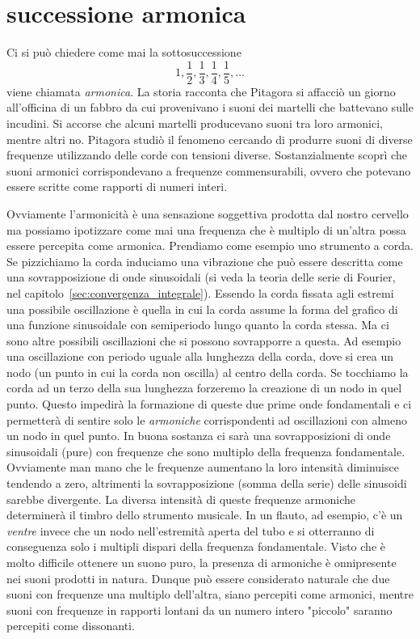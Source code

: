 \section{successione armonica}

Ci si può chiedere come mai la sottosuccessione
\[
 1, \frac 1 2, \frac 1 3, \frac 1 4, \frac 1 5, \dots
\]
viene chiamata \emph{armonica}.
La storia racconta che Pitagora si affacciò un giorno all'officina di un fabbro 
da cui provenivano i suoni dei martelli che battevano sulle incudini.
Si accorse che alcuni martelli producevano suoni tra loro armonici, mentre 
altri no. 
Pitagora studiò il fenomeno cercando di produrre suoni di diverse frequenze 
utilizzando delle corde con tensioni diverse. 
Sostanzialmente scoprì che suoni armonici corrispondevano a frequenze 
commensurabili, ovvero che potevano essere scritte come rapporti di numeri interi.

Ovviamente l'armonicità è una sensazione soggettiva prodotta dal nostro cervello 
ma possiamo ipotizzare come mai una frequenza che è multiplo di un'altra 
possa essere percepita come armonica.
Prendiamo come esempio uno strumento a corda. 
Se pizzichiamo la corda induciamo una vibrazione che 
può essere descritta come una sovrapposizione di onde sinusoidali
(si veda la teoria delle serie di Fourier, nel capitolo~\ref{sec:convergenza_integrale}).
Essendo la corda fissata agli estremi una possibile oscillazione 
è quella in cui la corda assume la forma del grafico di una funzione sinusoidale 
con semiperiodo lungo quanto la corda stessa.
Ma ci sono altre possibili oscillazioni che si possono sovrapporre a questa. 
Ad esempio una oscillazione con periodo uguale alla lunghezza della corda, 
dove si crea un nodo (un punto in cui la corda non oscilla) al centro della corda.
Se tocchiamo la corda ad un terzo della sua lunghezza forzeremo la creazione di un 
nodo in quel punto. Questo impedirà la formazione di queste due prime onde fondamentali 
e ci permetterà di sentire solo le \emph{armoniche} corrispondenti ad oscillazioni 
con almeno un nodo in quel punto.
In buona sostanza ci sarà una sovrapposizioni di onde sinusoidali (pure)
con frequenze che sono multiplo della frequenza fondamentale.
Ovviamente man mano che le frequenze aumentano la loro intensità diminuisce tendendo 
a zero, altrimenti la sovrapposizione (somma della serie) 
delle sinusoidi sarebbe divergente.
La diversa intensità di queste frequenze armoniche determinerà il timbro dello strumento 
musicale. In un flauto, ad esempio, c'è un \emph{ventre} invece che un nodo 
nell'estremità aperta del tubo e si otterranno di conseguenza solo i multipli dispari della frequenza fondamentale.
Visto che è molto difficile ottenere un suono puro, la presenza di armoniche 
è onnipresente nei suoni prodotti in natura. 
Dunque può essere considerato naturale che due suoni con frequenze 
una multiplo dell'altra, siano percepiti come armonici, 
mentre suoni con frequenze in rapporti lontani da un numero intero "piccolo"
saranno percepiti come dissonanti.

